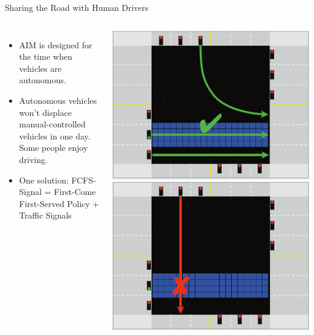\documentclass{beamer}
\begin{document}
\begin{frame}{Sharing the Road with Human Drivers}
\begin{columns}[c]
\begin{itemize}
\item AIM is designed for the time when vehicles are autonomous.
\item Autonomous vehicles won't displace manual-controlled vehicles in
one day. Some people enjoy driving.\pause
\item One solution: FCFS-Signal = First-Come First-Served Policy +
Traffic Signals \cite{bib:Dresner08Multiagent}
\end{itemize}
\includegraphics[width=\textwidth]{fcfs-light-1.png}
\hfill
\includegraphics[width=\textwidth]{fcfs-light-2.png}
\end{columns}
\end{frame}
\end{document}
